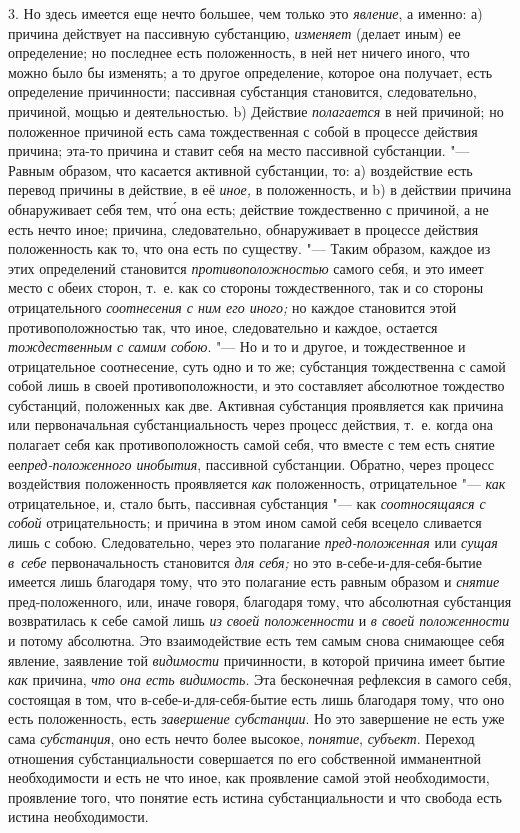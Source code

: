 3. Но здесь имеется еще нечто большее, чем только это {\em явление}, а именно:
а) причина действует на пассивную субстанцию, {\em изменяет} (делает
иным) ее определение; но последнее есть положенность, в ней нет ничего
иного, что можно было бы изменять; а то другое определение, которое она
получает, есть определение причинности; пассивная субстанция становится,
следовательно, причиной, мощью и деятельностью. b) Действие {\em полагается}
в ней причиной; но положенное причиной есть сама тождественная с собой в
процессе действия причина; эта-то причина и ставит себя на место пассивной
субстанции. "--- Равным образом, что касается активной субстанции, то:
а) воздействие есть перевод причины в действие, в её {\em иное,} в
положенность, и b) в действии причина обнаруживает себя тем, чт\'{о} она есть;
действие тождественно с причиной, а не есть нечто иное; причина,
следовательно, обнаруживает в процессе действия положенность как то, что
она есть по существу. "--- Таким образом, каждое из этих
определений становится {\em противоположностью}
самого себя, и это имеет место с обеих сторон, т.~е. как со стороны
тождественного, так и со стороны отрицательного {\em соотнесения с ним его
иного;} но каждое становится этой противоположностью так, что иное,
следовательно и каждое, остается {\em тождественным с самим собою}. "--- Но и
то и другое, и тождественное и отрицательное соотнесение, суть одно и то же;
субстанция тождественна с самой собой лишь в своей противоположности, и это
составляет абсолютное тождество субстанций, положенных как две. Активная
субстанция проявляется как причина или первоначальная субстанциальность
через процесс действия, т.~е. когда она полагает себя как противоположность
самой себя, что вместе с тем есть снятие ее{\em пред-положенного инобытия},
пассивной субстанции. Обратно, через процесс воздействия положенность
проявляется {\em как} положенность, отрицательное "--- {\em как} отрицательное,
и, стало быть, пассивная субстанция "--- как {\em соотносящаяся с собой}
отрицательность; и причина в этом ином самой себя всецело сливается лишь с
собою. Следовательно, через это полагание {\em пред-положенная} или
{\em сущая в~себе} первоначальность становится {\em для себя;} но это
в-себе-и-для-себя-бытие имеется лишь благодаря тому, что это полагание есть
равным образом и {\em снятие} пред-положенного, или, иначе говоря, благодаря
тому, что абсолютная субстанция возвратилась к себе самой лишь {\em из своей
положенности} и {\em в своей положенности} и потому абсолютна. Это
взаимодействие есть тем самым снова снимающее себя явление, заявление той
{\em видимости} причинности, в которой причина имеет бытие {\em как} причина,
{\em что она есть видимость}. Эта бесконечная рефлексия в самого себя,
состоящая в том, что в-себе-и-для-себя-бытие есть лишь благодаря тому, что
оно есть положенность, есть {\em завершение субстанции}. Но это завершение
не есть уже сама {\em субстанция}, оно есть нечто более высокое, {\em понятие},
{\em субъект}. Переход отношения субстанциальности совершается по его
собственной имманентной необходимости и есть не что иное, как проявление
самой этой необходимости, проявление того, что понятие есть истина
субстанциальности и что свобода есть истина необходимости.

